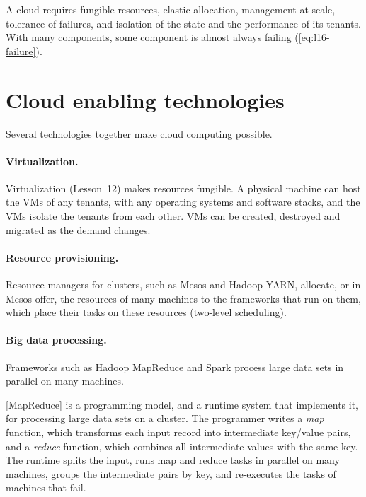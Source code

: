 \documentclass[../main.tex]{subfiles}
\begin{document}
\begin{keypoint}
  A cloud requires fungible resources, elastic allocation, management at
  scale, tolerance of failures, and isolation of the state and the
  performance of its tenants.  With many components, some component is
  almost always failing (\cref{eq:l16-failure}).
\end{keypoint}

\section{Cloud enabling technologies}
\label{sec:l16-technologies}

Several technologies together make cloud computing possible.

\paragraph{Virtualization.}  Virtualization (Lesson~12) makes resources
fungible.  A physical machine can host the VMs of any tenants, with any
operating systems and software stacks, and the VMs isolate the tenants from
each other.  VMs can be created, destroyed and migrated as the demand
changes.

\paragraph{Resource provisioning.}  Resource managers for clusters, such as
Mesos \cite{hindman2011} and Hadoop YARN, allocate, or in Mesos offer, the
resources of many machines to the frameworks that run on them, which place
their tasks on these resources (two-level scheduling).%

\paragraph{Big data processing.}  Frameworks such as Hadoop MapReduce and
Spark process large data sets in parallel on many machines.

\begin{definition}[MapReduce]
  [MapReduce] \cite{dean2004} is a programming model, and a
  runtime system that implements it, for processing large data sets on a
  cluster.  The programmer writes a \emph{map} function, which transforms
  each input record into intermediate key/value pairs, and a \emph{reduce}
  function, which combines all intermediate values with the same key.  The
  runtime splits the input, runs map and reduce tasks in parallel on many
  machines, groups the intermediate pairs by key, and re-executes the tasks
  of machines that fail.
\end{definition}
\end{document}

